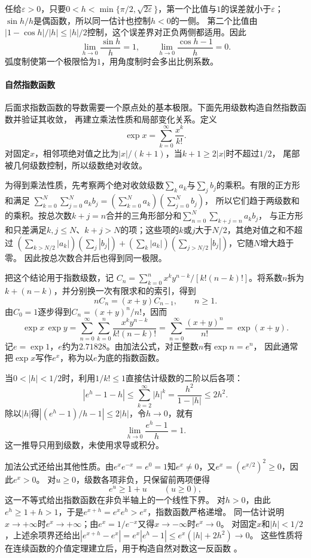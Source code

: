任给$\varepsilon>0$，只要$0<h<\min\{\pi/2,\sqrt{2\varepsilon}\}$，第一个比值与$1$的误差就小于$\varepsilon$；
$\sin h/h$是偶函数，所以同一估计也控制$h<0$的一侧。
第二个比值由$|1-\cos h|/|h|\leq|h|/2$控制，这个误差界对正负两侧都适用。因此
\[
 \lim_{h\to0}\frac{\sin h}{h}=1,
 \qquad
 \lim_{h\to0}\frac{\cos h-1}{h}=0.
\]
弧度制使第一个极限恰为$1$，用角度制时会多出比例系数。

\paragraph{自然指数函数}
后面求指数函数的导数需要一个原点处的基本极限。下面先用级数构造自然指数函数并验证其收敛，
再建立乘法性质和局部变化关系。定义
\[
 \exp x=\sum_{k=0}^{\infty}\frac{x^k}{k!}.
\]
对固定$x$，相邻项绝对值之比为$|x|/(k+1)$，当$k+1\geq2|x|$时不超过$1/2$，
尾部被几何级数控制，所以级数绝对收敛。

为得到乘法性质，先考察两个绝对收敛级数$\sum_k a_k$与$\sum_j b_j$的乘积。有限的正方形和满足
$\sum_{k=0}^N\sum_{j=0}^Na_kb_j=(\sum_{k=0}^Na_k)(\sum_{j=0}^Nb_j)$，
所以它们趋于两级数和的乘积。按总次数$k+j=n$合并的三角形部分和$\sum_{n=0}^{N}\sum_{k+j=n}a_kb_j$，
与正方形和只差满足$k,j\leq N$、$k+j>N$的项；这些项的$k$或$j$大于$N/2$，其绝对值之和不超过
$(\sum_{k>N/2}|a_k|)(\sum_j|b_j|)+(\sum_k|a_k|)(\sum_{j>N/2}|b_j|)$，它随$N$增大趋于零。
因此按总次数合并后也得到同一极限。

把这个结论用于指数级数，记
$C_n=\sum_{k=0}^n x^ky^{n-k}/[k!(n-k)!]$。将系数$n$拆为$k+(n-k)$，并分别换一次有限求和的索引，得到
\[
 nC_n=(x+y)C_{n-1},\qquad n\geq1.
\]
由$C_0=1$逐步得到$C_n=(x+y)^n/n!$，因而
\[
 \exp x\,\exp y
 =\sum_{n=0}^{\infty}\sum_{k=0}^n\frac{x^ky^{n-k}}{k!(n-k)!}
 =\sum_{n=0}^{\infty}\frac{(x+y)^n}{n!}
 =\exp(x+y).
\]
记$e=\exp1$，$e$约为$2.71828$。由加法公式，对正整数$n$有$\exp n=e^n$，
因此通常把$\exp x$写作$e^x$，称为以$e$为底的指数函数。

当$0<|h|<1/2$时，利用$1/k!\leq1$直接估计级数的二阶以后各项：
\[
 |e^h-1-h|
 \leq\sum_{k=2}^{\infty}|h|^k
 =\frac{h^2}{1-|h|}\leq2h^2.
\]
除以$|h|$得$|(e^h-1)/h-1|\leq2|h|$，令$h\to0$，就有
\[
 \lim_{h\to0}\frac{e^h-1}{h}=1.
\]
这一推导只用到级数，未使用求导或积分。

加法公式还给出其他性质。由$e^xe^{-x}=e^0=1$知$e^x\neq0$，又$e^x=(e^{x/2})^2\geq0$，因此$e^x>0$。
对$u\geq0$，级数各项非负，只保留前两项便得
\[
 e^u\geq1+u\qquad(u\geq0),
\]
这一不等式给出指数函数在非负半轴上的一个线性下界。
对$h>0$，由此$e^h\geq1+h>1$，于是$e^{x+h}=e^xe^h>e^x$，指数函数严格递增。
同一估计说明$x\to+\infty$时$e^x\to+\infty$；由$e^x=1/e^{-x}$又得$x\to-\infty$时$e^x\to0$。
对固定$x$和$|h|<1/2$，上述余项界还给出$|e^{x+h}-e^x|=e^x|e^h-1|\leq e^x(|h|+2h^2)\to0$。
这些性质将在连续函数的介值定理建立后，用于构造自然对数这一反函数
。

